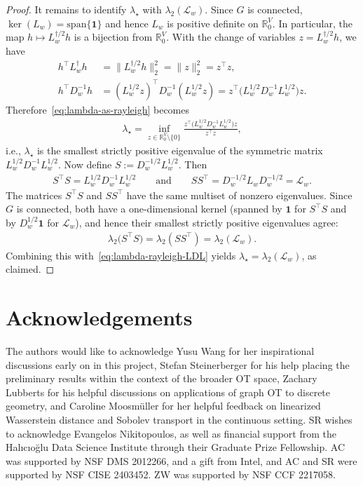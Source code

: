 \documentclass[11pt,a4paper]{article}
\begin{document}
\begin{proof}
    It remains to identify $\lambda_\star$ with $\lambda_2(\mathcal{L}_w)$. Since $G$ is connected, $\ker(L_w)=\mathrm{span}\{\mathbf{1}\}$ and hence $L_w$ is positive definite on $\mathbb{R}^V_0$. In particular, the map $h\mapsto L_w^{\dagger/2}h$ is a bijection from $\mathbb{R}^V_0$. With the change of variables $z=L_w^{\dagger/2}h$, we have
        \begin{align*}
            h^\top L_w^\dagger h &= \|L_w^{\dagger/2}h\|_2^2 = \|z\|_2^2 = z^\top z,\\
            h^\top D_w^{-1}h &= (L_w^{1/2}z)^\top D_w^{-1}(L_w^{1/2}z) = z^\top\bigl(L_w^{1/2}D_w^{-1}L_w^{1/2}\bigr)z.
        \end{align*}
    Therefore~\cref{eq:lambda-as-rayleigh} becomes
        \begin{align}\label{eq:lambda-rayleigh-LDL}
            \lambda_\star
            = \inf_{z\in\mathbb{R}^V_0\setminus\{0\}}
            \frac{z^\top\bigl(L_w^{1/2}D_w^{-1}L_w^{1/2}\bigr)z}{z^\top z},
        \end{align}
    i.e., $\lambda_\star$ is the smallest strictly positive eigenvalue of the symmetric matrix $L_w^{1/2}D_w^{-1}L_w^{1/2}$. Now define $S:=D_w^{-1/2}L_w^{1/2}$. Then
        \begin{align*}
            S^\top S = L_w^{1/2}D_w^{-1}L_w^{1/2}
            \qquad\text{and}\qquad
            SS^\top = D_w^{-1/2}L_wD_w^{-1/2} = \mathcal{L}_w.
        \end{align*}
    The matrices $S^\top S$ and $SS^\top$ have the same multiset of nonzero eigenvalues. Since $G$ is connected, both have a one-dimensional kernel (spanned by $\mathbf{1}$ for $S^\top S$ and by $D_w^{1/2}\mathbf{1}$ for $\mathcal{L}_w$), and hence their smallest strictly positive eigenvalues agree:
        \begin{align*}
            \lambda_{2}\bigl(S^\top S\bigr) = \lambda_2(SS^\top) = \lambda_2(\mathcal{L}_w).
        \end{align*}
    Combining this with~\cref{eq:lambda-rayleigh-LDL} yields $\lambda_\star=\lambda_2(\mathcal{L}_w)$, as claimed.
\end{proof}


\section*{Acknowledgements}\label{sec:acknowledgements}

The authors would like to acknowledge Yusu Wang for her inspirational discussions early on in this project, Stefan Steinerberger for his help placing the preliminary results within the context of the broader OT space, Zachary Lubberts for his helpful discussions on applications of graph OT to discrete geometry, and Caroline Moosm\"{u}ller for her helpful feedback on linearized Wasserstein distance and Sobolev transport in the continuous setting. SR wishes to acknowledge Evangelos Nikitopoulos, as well as financial support from the Hal\i{}c\i{}o\u{g}lu Data Science Institute through their Graduate Prize Fellowship.  AC was supported by NSF DMS 2012266,  and a gift from Intel, and AC and SR were supported by NSF CISE 2403452. ZW was supported by NSF CCF 2217058.
\end{document}
